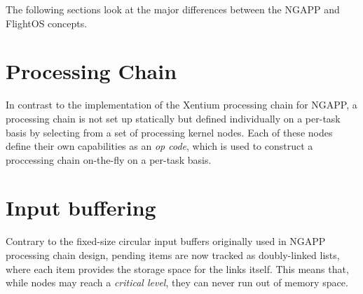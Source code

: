 The following sections look at the major differences between the NGAPP and
FlightOS concepts.

\section {Processing Chain}

In contrast to the implementation of the Xentium processing chain for
\gls{NGAPP}, a processing chain is not set up statically but defined
individually on a per-task basis by selecting from a set of processing kernel
nodes. Each of these nodes define their own capabilities as an \emph{op code},
which is used to construct a proccessing chain on-the-fly on a per-task basis.


\section {Input buffering}

Contrary to the fixed-size circular input buffers originally used in \gls{NGAPP}
processing chain design, pending items are now tracked as doubly-linked lists,
where each item provides the storage space for the links itself. This means
that, while nodes may reach a \emph{critical level}, they can never run out of
memory space.




